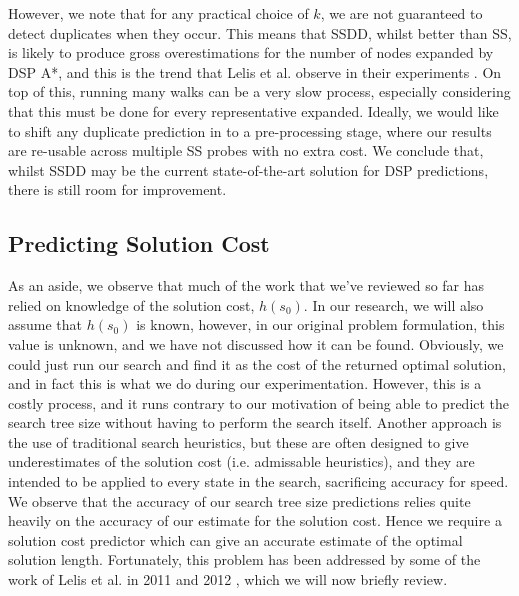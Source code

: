 \documentclass{article}
\begin{document}
However, we note that for any practical choice of \(k\), we are not guaranteed to detect duplicates when they occur.
This means that SSDD, whilst better than SS, is likely to produce gross overestimations for the number of nodes expanded by DSP A*,
and this is the trend that Lelis et al. observe in their experiments \cite{lelis2014estimating}.
On top of this, running many walks can be a very slow process, especially considering
that this must be done for every representative expanded.
Ideally, we would like to shift any duplicate prediction in to a pre-processing stage,
where our results are re-usable across multiple SS probes with no extra cost.
We conclude that, whilst SSDD may be the current state-of-the-art solution for DSP predictions,
there is still room for improvement.



\subsection{Predicting Solution Cost}

As an aside, we observe that much of the work that we've reviewed so far has relied on knowledge of the solution cost, \(h(s_0)\).
In our research, we will also assume that \(h(s_0)\) is known,
however, in our original problem formulation, this value is unknown, and we have not discussed how it can be found.
Obviously, we could just run our search and find it as the cost of the returned optimal solution,
and in fact this is what we do during our experimentation.
However, this is a costly process, and it runs contrary to our motivation of being able to
predict the search tree size without having to perform the search itself.
Another approach is the use of traditional search heuristics,
but these are often designed to give underestimates of the solution cost (i.e. admissable heuristics),
and they are intended to be applied to every state in the search,
sacrificing accuracy for speed.
We observe that the accuracy of our search tree size predictions
relies quite heavily on the accuracy of our estimate for the solution cost.
Hence we require a solution cost predictor which can give an accurate estimate of
the optimal solution length.
Fortunately, this problem has been addressed by some of the work of Lelis et al. in 2011 and 2012 \cite{lelis2011predicting, lelis2012predicting}, which we will now briefly review. \\
\end{document}
